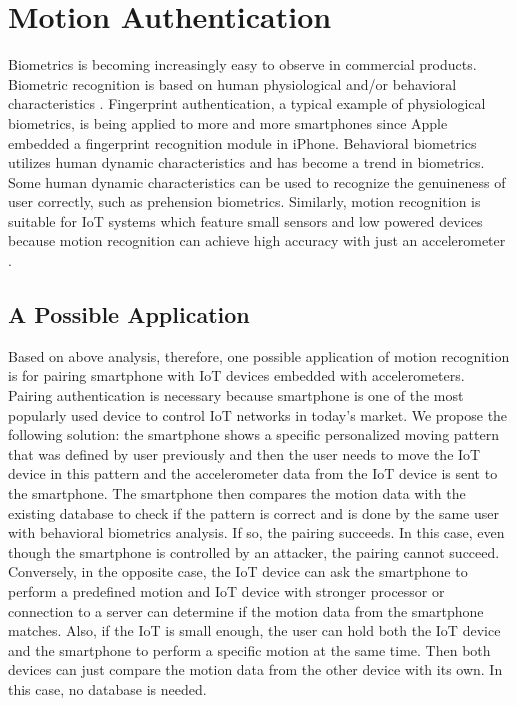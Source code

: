 
\section{Motion Authentication}
\label{sec:motionauth}

Biometrics is becoming increasingly easy to observe in commercial products. Biometric recognition is based on human physiological and/or behavioral characteristics \cite{Jain}. Fingerprint authentication, a typical example of physiological biometrics, is being applied to more and more smartphones since Apple embedded a fingerprint recognition module in iPhone. Behavioral biometrics utilizes human dynamic characteristics and has become a trend in biometrics. Some human dynamic characteristics can be used to recognize the genuineness of user correctly, such as prehension biometrics\cite{Drosou}. Similarly, motion recognition is suitable for \gls{IoT} systems which feature small sensors and low powered devices because motion recognition can achieve high accuracy with just an accelerometer \cite{RuizeXu}.

\subsection{A Possible Application}
Based on above analysis, therefore, one possible application of motion recognition is for pairing smartphone with IoT devices embedded with accelerometers. Pairing authentication is necessary because smartphone is one of the most popularly used device to control \gls{IoT} networks in today's market. We propose the following solution: the smartphone shows a specific personalized moving pattern that was defined by user previously and then the user needs to move the \gls{IoT} device in this pattern and the accelerometer data from the \gls{IoT} device is sent to the smartphone. The smartphone then compares the motion data with the existing database to check if the pattern is correct and is done by the same user with behavioral biometrics analysis. If so, the pairing succeeds. In this case, even though the smartphone is controlled by an attacker, the pairing cannot succeed. Conversely, in the opposite case, the \gls{IoT} device can ask the smartphone to perform a predefined motion and IoT device with stronger processor or connection to a server can determine if the motion data from the smartphone matches.  Also, if the \gls{IoT} is small enough, the user can hold both the \gls{IoT} device and the smartphone to perform a specific motion at the same time. Then both devices can just compare the motion data from the other device with its own. In this case, no database is needed.

